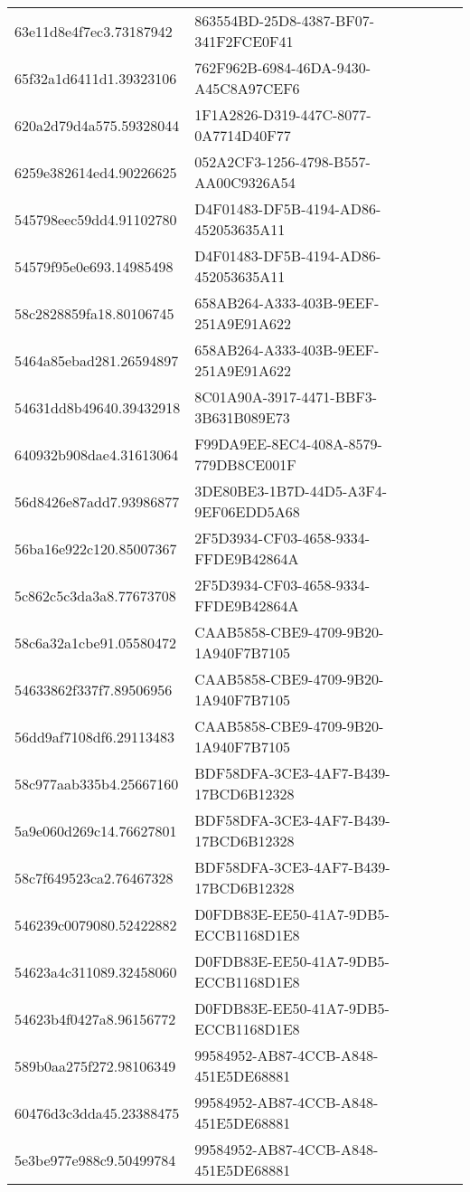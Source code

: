 \begin{tabular}{ll}
63e11d8e4f7ec3.73187942 & 863554BD-25D8-4387-BF07-341F2FCE0F41 \\
65f32a1d6411d1.39323106 & 762F962B-6984-46DA-9430-A45C8A97CEF6 \\
620a2d79d4a575.59328044 & 1F1A2826-D319-447C-8077-0A7714D40F77 \\
6259e382614ed4.90226625 & 052A2CF3-1256-4798-B557-AA00C9326A54 \\
545798eec59dd4.91102780 & D4F01483-DF5B-4194-AD86-452053635A11 \\
54579f95e0e693.14985498 & D4F01483-DF5B-4194-AD86-452053635A11 \\
58c2828859fa18.80106745 & 658AB264-A333-403B-9EEF-251A9E91A622 \\
5464a85ebad281.26594897 & 658AB264-A333-403B-9EEF-251A9E91A622 \\
54631dd8b49640.39432918 & 8C01A90A-3917-4471-BBF3-3B631B089E73 \\
640932b908dae4.31613064 & F99DA9EE-8EC4-408A-8579-779DB8CE001F \\
56d8426e87add7.93986877 & 3DE80BE3-1B7D-44D5-A3F4-9EF06EDD5A68 \\
56ba16e922c120.85007367 & 2F5D3934-CF03-4658-9334-FFDE9B42864A \\
5c862c5c3da3a8.77673708 & 2F5D3934-CF03-4658-9334-FFDE9B42864A \\
58c6a32a1cbe91.05580472 & CAAB5858-CBE9-4709-9B20-1A940F7B7105 \\
54633862f337f7.89506956 & CAAB5858-CBE9-4709-9B20-1A940F7B7105 \\
56dd9af7108df6.29113483 & CAAB5858-CBE9-4709-9B20-1A940F7B7105 \\
58c977aab335b4.25667160 & BDF58DFA-3CE3-4AF7-B439-17BCD6B12328 \\
5a9e060d269c14.76627801 & BDF58DFA-3CE3-4AF7-B439-17BCD6B12328 \\
58c7f649523ca2.76467328 & BDF58DFA-3CE3-4AF7-B439-17BCD6B12328 \\
546239c0079080.52422882 & D0FDB83E-EE50-41A7-9DB5-ECCB1168D1E8 \\
54623a4c311089.32458060 & D0FDB83E-EE50-41A7-9DB5-ECCB1168D1E8 \\
54623b4f0427a8.96156772 & D0FDB83E-EE50-41A7-9DB5-ECCB1168D1E8 \\
589b0aa275f272.98106349 & 99584952-AB87-4CCB-A848-451E5DE68881 \\
60476d3c3dda45.23388475 & 99584952-AB87-4CCB-A848-451E5DE68881 \\
5e3be977e988c9.50499784 & 99584952-AB87-4CCB-A848-451E5DE68881 \\

\end{tabular}
